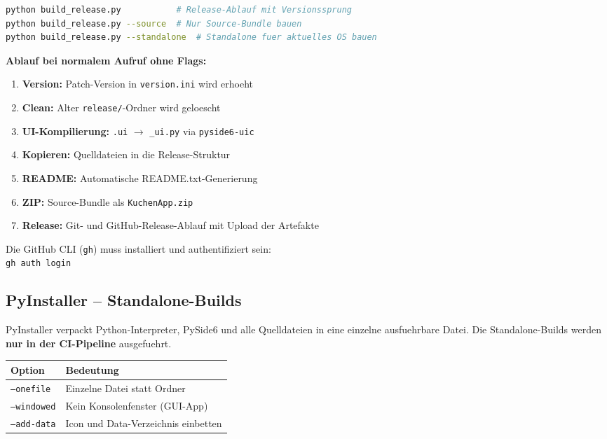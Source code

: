 \documentclass[12pt, a4paper]{article}
\begin{document}
\begin{codebox}[Verwendung]
\begin{lstlisting}[language=bash, numbers=none]
python build_release.py           # Release-Ablauf mit Versionssprung
python build_release.py --source  # Nur Source-Bundle bauen
python build_release.py --standalone  # Standalone fuer aktuelles OS bauen
\end{lstlisting}
\end{codebox}

\textbf{Ablauf bei normalem Aufruf ohne Flags:}
\begin{enumerate}[leftmargin=1.5em]
    \item \textbf{Version:} Patch-Version in \texttt{version.ini} wird erhoeht
    \item \textbf{Clean:} Alter \texttt{release/}-Ordner wird geloescht
    \item \textbf{UI-Kompilierung:} \texttt{.ui} $\rightarrow$ \texttt{\_ui.py}
        via \texttt{pyside6-uic}
    \item \textbf{Kopieren:} Quelldateien in die Release-Struktur
    \item \textbf{README:} Automatische README.txt-Generierung
    \item \textbf{ZIP:} Source-Bundle als \texttt{KuchenApp.zip}
    \item \textbf{Release:} Git- und GitHub-Release-Ablauf mit Upload der Artefakte
\end{enumerate}

\begin{warnbox}
Die GitHub CLI (\texttt{gh}) muss installiert und authentifiziert sein:\\
\texttt{gh auth login}
\end{warnbox}

\subsection{PyInstaller -- Standalone-Builds}

PyInstaller verpackt Python-Interpreter, PySide6 und alle Quelldateien in
eine einzelne ausfuehrbare Datei. Die Standalone-Builds werden
\textbf{nur in der CI-Pipeline} ausgefuehrt.

\begin{table}[ht!]
\centering
{}
\begin{tabularx}{0.85\textwidth}{lX}
\toprule
\textbf{Option} & \textbf{Bedeutung} \\
\midrule
\texttt{--onefile} & Einzelne Datei statt Ordner \\
\texttt{--windowed} & Kein Konsolenfenster (GUI-App) \\
\texttt{--add-data} & Icon und Data-Verzeichnis einbetten \\
\bottomrule
\end{tabularx}
\end{table}
\end{document}
